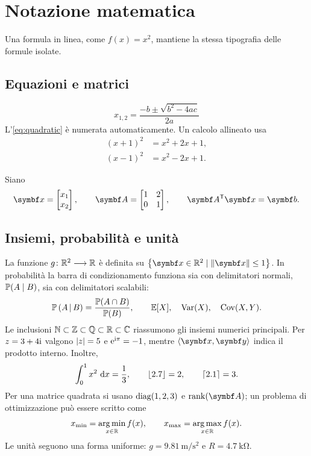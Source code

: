 \documentclass{../../../unipd-notes}
\begin{document}
\chapter{Notazione matematica}

Una formula in linea, come $f(x)=x^2$, mantiene la stessa tipografia delle formule isolate.

\section{Equazioni e matrici}
\begin{equation}\label{eq:quadratic}
  x_{1,2}=\frac{-b\pm\sqrt{b^2-4ac}}{2a}
\end{equation}
L'\cref{eq:quadratic} è numerata automaticamente. Un calcolo allineato usa
\begin{align}
  (x+1)^2 &= x^2+2x+1,\\
  (x-1)^2 &= x^2-2x+1.
\end{align}

Siano
\[
  \vect{x}=\begin{bmatrix}x_1\\x_2\end{bmatrix},\qquad
  \mat{A}=\begin{bmatrix}1&2\\0&1\end{bmatrix},\qquad
  \mat{A}\transpose\vect{x}=\vect{b}.
\]

\section{Insiemi, probabilità e unità}
La funzione $\functionmap{g}{\R^2}{\R}$ è definita su
$\set{\vect{x}\in\R^2 \suchthat \norm*{\vect{x}}\leq 1}$.
In probabilità la barra di condizionamento funziona sia con delimitatori normali,
$\Prob(A\given B)$, sia con delimitatori scalabili:
\[
  \Prob\left(A\givenscaled B\right)=\frac{\Prob(A\cap B)}{\Prob(B)},
  \qquad \Expected[X],\quad \Var(X),\quad \Cov(X,Y).
\]
Le inclusioni $\N\subset\Z\subset\Q\subset\R\subset\C$ riassumono gli insiemi numerici principali. Per $z=3+4\imaginaryunit$ valgono $\abs*{z}=5$ e $\exponential^{\imaginaryunit\pi}=-1$, mentre $\inner*{\vect{x},\vect{y}}$ indica il prodotto interno. Inoltre,
\[
  \int_0^1 x^2\,\diff x=\frac{1}{3},\qquad
  \floor*{2.7}=2,\qquad \ceil*{2.1}=3.
\]
Per una matrice quadrata si usano $\diag(1,2,3)$ e $\rank(\mat{A})$; un problema di ottimizzazione può essere scritto come
\[
  x_{\min}=\argmin_{x\in\R} f(x),\qquad
  x_{\max}=\argmax_{x\in\R} f(x).
\]
Le unità seguono una forma uniforme: $g=\qty{9.81}{\metre\per\second\squared}$ e $R=\qty{4.7}{\kilo\ohm}$.
\end{document}
